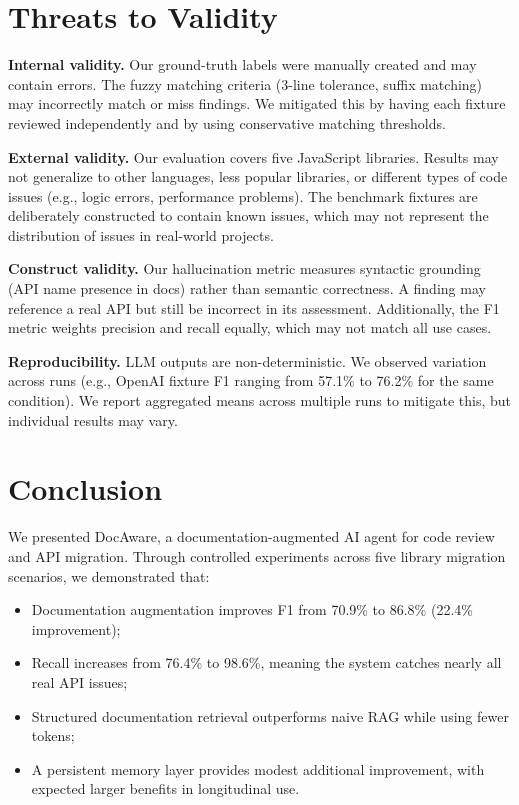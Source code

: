 \documentclass[sigconf,nonacm]{acmart}
\begin{document}
\section{Threats to Validity}
\label{sec:threats}

\textbf{Internal validity.} Our ground-truth labels were manually created and may contain errors. The fuzzy matching criteria (3-line tolerance, suffix matching) may incorrectly match or miss findings. We mitigated this by having each fixture reviewed independently and by using conservative matching thresholds.

\textbf{External validity.} Our evaluation covers five JavaScript libraries. Results may not generalize to other languages, less popular libraries, or different types of code issues (e.g., logic errors, performance problems). The benchmark fixtures are deliberately constructed to contain known issues, which may not represent the distribution of issues in real-world projects.

\textbf{Construct validity.} Our hallucination metric measures syntactic grounding (API name presence in docs) rather than semantic correctness. A finding may reference a real API but still be incorrect in its assessment. Additionally, the F1 metric weights precision and recall equally, which may not match all use cases.

\textbf{Reproducibility.} LLM outputs are non-deterministic. We observed variation across runs (e.g., OpenAI fixture F1 ranging from 57.1\% to 76.2\% for the same condition). We report aggregated means across multiple runs to mitigate this, but individual results may vary.

\section{Conclusion}
\label{sec:conclusion}

We presented DocAware, a documentation-augmented AI agent for code review and API migration. Through controlled experiments across five library migration scenarios, we demonstrated that:

\begin{itemize}
    \item Documentation augmentation improves F1 from 70.9\% to 86.8\% (22.4\% improvement);
    \item Recall increases from 76.4\% to 98.6\%, meaning the system catches nearly all real API issues;
    \item Structured documentation retrieval outperforms naive RAG while using fewer tokens;
    \item A persistent memory layer provides modest additional improvement, with expected larger benefits in longitudinal use.
\end{itemize}
\end{document}
